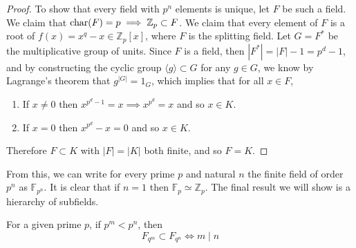 \begin{proof}
    To show that every field with $p^n$ elements is unique, let $F$ be such a field. We claim that $\Char(F) = p \implies \mathbb{Z}_p \subset F$. We claim that every element of $F$ is a root of $f(x) = x^q - x \in \mathbb{Z}_p [x]$, where $F$ is the splitting field. Let $G = F^\ast$ be the multiplicative group of units. Since $F$ is a field, then $|F^\ast| = |F| - 1 = p^d - 1$, and by constructing the cyclic group $\langle g \rangle \subset G$ for any $g \in G$, we know by Lagrange's theorem that $g^{|G|} = 1_G$, which implies that for all $x \in F$, 
    \begin{enumerate}
      \item If $x \neq 0$ then $x^{p^d - 1} = x \implies x^{p^d} = x$ and so $x \in K$. 
      \item If $x = 0$ then $x^{p^d} - x = 0$ and so $x \in K$. 
    \end{enumerate}
    Therefore $F \subset K$ with $|F| = |K|$ both finite, and so $F = K$. 
  \end{proof} 

  From this, we can write for every prime $p$ and natural $n$ the finite field of order $p^n$ as $\mathbb{F}_{p^n}$. It is clear that if $n = 1$ then $\mathbb{F}_p \simeq \mathbb{Z}_p$. The final result we will show is a hierarchy of subfields. 

  \begin{theorem}
    For a given prime $p$, if $p^m < p^n$, then 
    \begin{equation}
      F_{q^m} \subset F_{q^n} \iff m \mid n
    \end{equation}
  \end{theorem}

